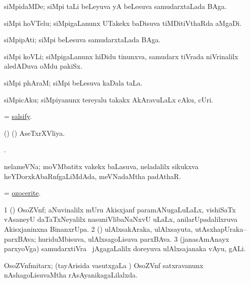 \bentry
{}
\gl{\nA}
\bmng
siMpidaMDe; siMpi taLi beLeyuva yA beLesuva samudarxtaLada BAga. 
\emng
\eentry

\bentry
{}
\gl{\nA}
\bmng
siMpi hoVTelu; siMpigaLanunx UTakekx baDisuva tiMDitiVthaRda aMgaDi. 
\emng
\eentry

\bentry
{}
\gl{\nA}
\bmng
siMpipAti; siMpi beLesuva samudarxtaLada BAga. 
\emng
\eentry

\bentry
{}
\gl{\nA}
\bmng
siMpi koVLi; siMpigaLanunx hiDidu tinunxva, samudarx tiVrada niVrinalilx aledADuva oMdu pakiSx. 
\emng
\eentry

\bentry
{}
\gl{\nA}
\bmng
siMpi phAraM; siMpi beLesuva kaDala taLa. 
\emng
\eentry

\bentry
{}
\gl{\nA}
\bmng
siMpicAku; siMpiyanunx tereyalu takakx AkAravuLaLx cAku, cUri.  
\emng
\eentry

\bentry
{}
\gl{\nA}
\bmng
= \hyperref{kandict_s.pdf}{S}{salsify}{salsify}. 
\emng
\eentry


\bentry
{}
\gl{\nA}
\expl{}
\bmng
(\AseTxrXV) (\ashi) AseTxrXVliya. 
\emng
\eentry

\bentry
{}
\gl{\saMkiSx}
\bmng
{}. 
\emng
\eentry

\bentry
{}
\gl{\nA}
\bmng
nelameVNa; moVMbatitx \mo vakekx baLasuva, neladalilx sikukxva heYDorxkAbaRnfgaLiMdAda, meVNadaMtha padAthaR. 
\emng
\eentry

\bentry
{}
\gl{\nA}
\bmng
= \hyperlink{ozocerite}{ozocerite}. 
\emng
\eentry


\bentry
{}
\gl{\nA}
\bmng
\bnum
\num{1} (\ravi) OsoZVnf; aNuvinalilx mUru Akisxjanf paramANugaLuLaLx, vishiSaTx vAsaneyU daTaTxNeyalilx nasuniVlibaNaNxvU uLaLx, anilarUpadalilxruva Akisxjaninxna BinanxrUpa. 
\num{2} (\rUpa) ulAlxsakAraka, ulAlxsayuta, utAsxhapUraka--parxBAva; huriduMbisuva, ulAlxsagoLisuva parxBAva. 
\num{3} (janasAmAnayx parxyoVga) samudarxtiVra \mo\ jAgagaLalilx doreyuva ulAlxsajanaka vAyu, gALi. 
\enum
\emng
\eentry

\bentry
{}
\gl{\gu}
\bmng
OsoZVnfmitarx; (tayArisida vasutxgaLa \vi) OsoZVnf satxravanunx nAshagoLisuvaMtha rAsAyanikagaLilalxda. 
\emng
\eentry

